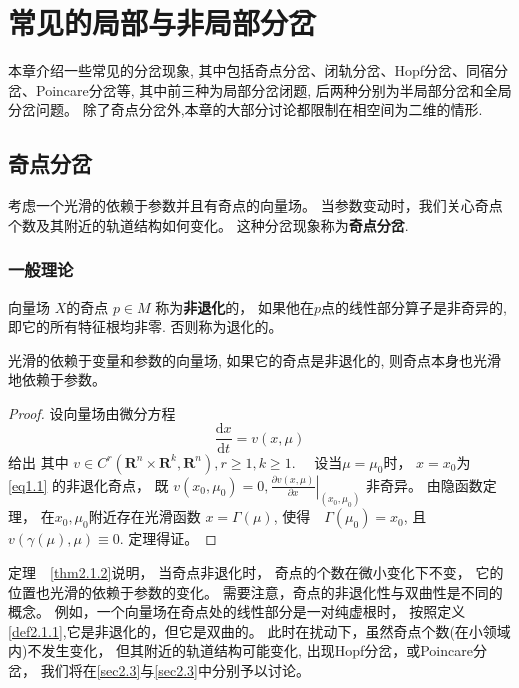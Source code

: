 \chapter{常见的局部与非局部分岔}
本章介绍一些常见的分岔现象,
其中包括奇点分岔、闭轨分岔、Hopf分岔、同宿分岔、Poincare分岔等,
其中前三种为局部分岔闭题,
后两种分别为半局部分岔和全局分岔问题。
除了奇点分岔外,本章的大部分讨论都限制在相空间为二维的情形.
\section{奇点分岔}
考虑一个光滑的依赖于参数并且有奇点的向量场。
当参数变动时，我们关心奇点个数及其附近的轨道结构如何变化。
这种分岔现象称为\textbf{奇点分岔}.
\subsection{一般理论}
\begin{defination}\label{def2.1.1}
  向量场 \(X\)的奇点 \( p \in M \) 称为\textbf{非退化}的，
  如果他在\(p\)点的线性部分算子是非奇异的,
  即它的所有特征根均非零.
  否则称为退化的。
  \label{def2.1.1}
\end{defination}

\begin{theorem}\label{thm2.1.2}
  光滑的依赖于变量和参数的向量场,
  如果它的奇点是非退化的,
  则奇点本身也光滑地依赖于参数。
  \label{thm2.1.2}
\end{theorem}

\begin{proof}
  设向量场由微分方程
  \begin{equation}
    \frac{\mathrm{d} x}{\mathrm{d} t}=v(x, \mu)
    \label{eq1.1}
  \end{equation}
  给出
  其中
  \(v \in C^{r}\left(\mathbf{R}^{n} \times \mathbf{R}^{k}, \mathbf{R}^{n}\right), r \geqslant 1, k \geqslant 1  \).
  　设当\(\mu = \mu_{0}\)时，
  \(x=x_{0}\)为　\ref{eq1.1}
  的非退化奇点，
  既
  \(
  v\left(x_{0}, \mu_{0}\right)=0,\left.\frac{\partial v(x, \mu)}{\partial x}\right|_{\left(x_{0}, \mu_{0}\right)}
  \)
  非奇异。
  由隐函数定理，
  在\(x_{0},\mu_{0}\)附近存在光滑函数
  \(x= \Gamma (\mu)\),
  使得　\(\Gamma ( \mu_{0}) = x_{0}\),
  且
  \(
v(\gamma(\mu), \mu) \equiv 0
  \).
  定理得证。
\end{proof}

\begin{remark}
  \label{rmk2.1.3}
  定理　\ref{thm2.1.2}说明，
  当奇点非退化时，
  奇点的个数在微小变化下不变，
  它的位置也光滑的依赖于参数的变化。
  需要注意，奇点的非退化性与双曲性是不同的概念。
  例如，一个向量场在奇点处的线性部分是一对纯虚根时，
  按照定义\ref{def2.1.1},它是非退化的，但它是双曲的。
  此时在扰动下，虽然奇点个数(在小领域内)不发生变化，
  但其附近的轨道结构可能变化,
  出现Hopf分岔，或Poincare分岔，
  我们将在\ref{sec2.3}与\ref{sec2.3}中分别予以讨论。
\end{remark}

